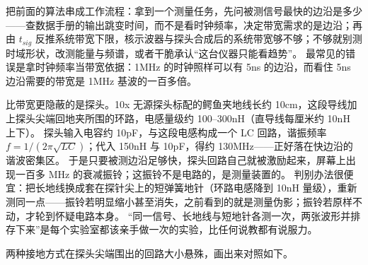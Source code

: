 把前面的算法串成工作流程：拿到一个测量任务，先问被测信号最快的边沿是多少——查数据手册的输出跳变时间，而不是看时钟频率，决定带宽需求的是边沿；再由 $t_{sig}$ 反推系统带宽下限，核示波器与探头合成后的系统带宽够不够；不够就别测时域形状，改测能量与频谱，或者干脆承认“这台仪器只能看趋势”。
最常见的错误是拿时钟频率当带宽依据：1MHz 的时钟照样可以有 5ns 的边沿，而看住 5ns 边沿需要的带宽是 1MHz 基波的一百多倍。

比带宽更隐蔽的是探头。10x 无源探头标配的鳄鱼夹地线长约 10cm，这段导线加上探头尖端回地夹所围的环路，电感量级约 100--300nH（直导线每厘米约 10nH 上下）。
探头输入电容约 10pF，与这段电感构成一个 LC 回路，谐振频率 $f = 1/(2\pi\sqrt{LC})$；代入 150nH 与 10pF，得约 130MHz——正好落在快边沿的谐波密集区。
于是只要被测边沿足够快，探头回路自己就被激励起来，屏幕上出现一百多 MHz 的衰减振铃；这振铃不是电路的，是测量装置的。
判别办法很便宜：把长地线换成套在探针尖上的短弹簧地针（环路电感降到 10nH 量级），重新测同一点——振铃若明显缩小甚至消失，之前看到的就是测量伪影；振铃若原样不动，才轮到怀疑电路本身。
“同一信号、长地线与短地针各测一次，两张波形并排存下来”是每个实验室都该亲手做一次的实验，比任何说教都有说服力。

两种接地方式在探头尖端围出的回路大小悬殊，画出来对照如下。

